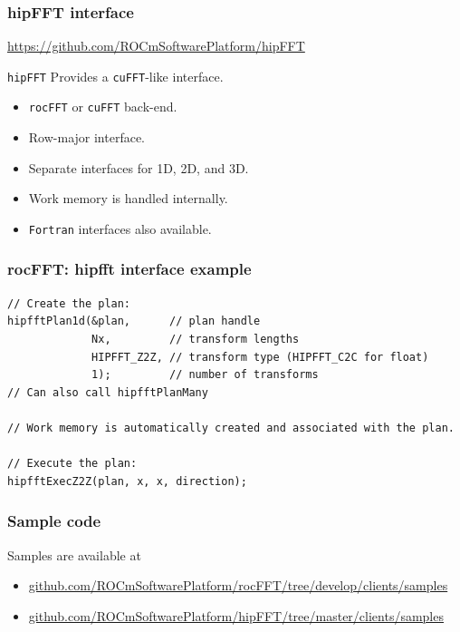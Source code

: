 \documentclass[10pt,aspectratio=169]{beamer}
\begin{document}
\begin{frame}
  \frametitle{hipFFT interface}
  \url{https://github.com/ROCmSoftwarePlatform/hipFFT}
  
  \texttt{hipFFT} Provides a \texttt{cuFFT}-like interface.

  \begin{itemize}
  \item \texttt{rocFFT} or \texttt{cuFFT} back-end.
  \item Row-major interface.
  \item Separate interfaces for 1D, 2D, and 3D.
  \item Work memory is handled internally.
  \item \texttt{Fortran} interfaces also available.
  \end{itemize}
  
\end{frame}
    
\begin{frame}[fragile]
    \frametitle{rocFFT: hipfft interface example}

\begin{lstlisting}
// Create the plan:
hipfftPlan1d(&plan,      // plan handle
             Nx,         // transform lengths
             HIPFFT_Z2Z, // transform type (HIPFFT_C2C for float)
             1);         // number of transforms
// Can also call hipfftPlanMany
             
// Work memory is automatically created and associated with the plan.

// Execute the plan:
hipfftExecZ2Z(plan, x, x, direction);
\end{lstlisting}

\end{frame}

\begin{frame}
  \frametitle{Sample code}

  Samples are available at
    \medskip
  \begin{itemize}
  \item \url{github.com/ROCmSoftwarePlatform/rocFFT/tree/develop/clients/samples}
    \medskip
  \item \url{github.com/ROCmSoftwarePlatform/hipFFT/tree/master/clients/samples}
  \end{itemize}
    
  
\end{frame}
\end{document}
